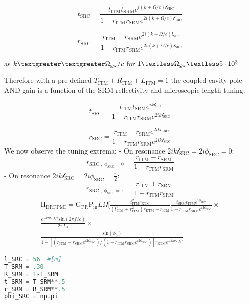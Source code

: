 \[ t_\mathrm{SRC} = \frac{t_\mathrm{ITM}t_\mathrm{SRM} e^{i  (k + \Omega/c) \mathscr{l}_\mathrm{SRC}}}{1- r_\mathrm{ITM}r_\mathrm{SRM} e^{2i  (k + \Omega/c) \mathscr{l}_\mathrm{SRC}}}\]

\[ r_\mathrm{SRC} = \frac{r_\mathrm{ITM} - r_\mathrm{SRM} e^{2i  (k + \Omega/c) l_\mathrm{SRC}}}{1- r_\mathrm{ITM}r_\mathrm{SRM} e^{2i  (k + \Omega/c) \mathscr{l}_\mathrm{SRC}}}\]

as \(k \textgreater \textgreater \Omega_\mathrm{gw}/c\) for $ 1 \textless \Omega_\mathrm{gw} \textless 5 \cdot 10^3 $

Therefore with a pre-defined
\(T_\mathrm{ITM} + R_\mathrm{ITM} + L_\mathrm{ITM} = 1\) the coupled
cavity pole AND gain is a function of the SRM reflectivity and
microscopic length tuning:

\[ t_\mathrm{SRC} = \frac{t_\mathrm{ITM}t_\mathrm{SRM} e^{i k \mathscr{l}_\mathrm{SRC}}}{1- r_\mathrm{ITM}r_\mathrm{SRM} e^{2i k \mathscr{l}_\mathrm{SRC}}}\]

\[ r_\mathrm{SRC} = \frac{r_\mathrm{ITM} - r_\mathrm{SRM} e^{2i k l_\mathrm{SRC}}}{1- r_\mathrm{ITM}r_\mathrm{SRM} e^{2i k \mathscr{l}_\mathrm{SRC}}}\]We
now observe the tuning extrema: 
- On resonance
\(2ik \mathscr{l}_\mathrm{SRC} = 2i\phi_\mathrm{SRC} = 0\):
\[ r_\mathrm{SRC \; , \; \phi_{SRC} = 0} = \frac{r_\mathrm{ITM} - r_\mathrm{SRM}}{1- r_\mathrm{ITM}r_\mathrm{SRM}}\]
- On resonance $2ik \mathscr{l}_\mathrm{SRC} = 2i\phi_\mathrm{SRC}= \frac{\pi}{2} $:
\[ r_\mathrm{SRC \; , \; \phi_{SRC} = \pi} = \frac{r_\mathrm{ITM} + r_\mathrm{SRM}}{1+ r_\mathrm{ITM}r_\mathrm{SRM}}\]
\begin{multline*}
	\mathrm{H}_\mathrm{DRFPMI} =  \mathrm{G}_\mathrm{PR} \mathrm{P}_\mathrm{in} L \Omega \bigg[ \frac{ t_\mathrm{ITM}^2 r_\mathrm{ETM}}{(t_\mathrm{ITM}^2 + r_\mathrm{ITM}^2)r_\mathrm{ETM} - r_\mathrm{ITM}} \frac{t_\mathrm{SRM} t_\mathrm{ITM} e^{i\phi_\mathrm{SRC}}}{1-r_\mathrm{ITM} r_\mathrm{SRM} e^{i2\phi_\mathrm{SRC}}} \times \\
				      \frac{e^{-i 2 \pi L f / c} \mathrm{sin}( 2 \pi f / c)}{ 2 \pi L f } \times \\
				      \frac{\mathrm{sin}(\phi_0)}{1- [(r_\mathrm{ITM} - r_\mathrm{SRM} e^{i2\phi_\mathrm{SRC}})/(1-r_\mathrm{ITM} r_\mathrm{SRM} e^{i2\phi_\mathrm{SRC}})] r_\mathrm{ETM} e^{-i 4 \pi L f / c}} \bigg] 
\end{multline*}

\begin{lstlisting}[frame=single, language=Python]
l_SRC = 56  #[m]
T_SRM = .30
R_SRM = 1-T_SRM
t_SRM = T_SRM**.5
r_SRM = R_SRM**.5
phi_SRC = np.pi
\end{lstlisting}


